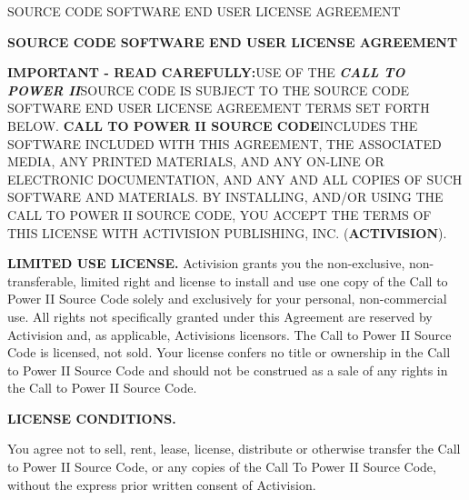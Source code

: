 \begin{section}{SOURCE CODE SOFTWARE END USER LICENSE AGREEMENT}

\begin{center}
\textbf{{\small SOURCE CODE SOFTWARE END USER LICENSE AGREEMENT}}
\end{center}

\begin{flushleft}
\textbf{{\footnotesize IMPORTANT - READ CAREFULLY:}}{\footnotesize  USE OF THE }\textbf{\textit{{\footnotesize CALL TO POWER II}}}{\footnotesize  SOURCE CODE IS SUBJECT TO THE SOURCE CODE SOFTWARE END USER LICENSE AGREEMENT TERMS SET FORTH BELOW. }\textbf{{\footnotesize CALL TO POWER II SOURCE CODE}}{\footnotesize  INCLUDES THE SOFTWARE INCLUDED WITH THIS AGREEMENT, THE ASSOCIATED MEDIA, ANY PRINTED MATERIALS, AND ANY ON-LINE OR ELECTRONIC DOCUMENTATION, AND ANY AND ALL COPIES OF SUCH SOFTWARE AND MATERIALS.  BY INSTALLING, AND/OR USING THE CALL TO POWER II SOURCE CODE, YOU ACCEPT THE TERMS OF THIS LICENSE WITH ACTIVISION PUBLISHING, INC. (}\textbf{{\footnotesize ACTIVISION}}{\footnotesize ). }
\end{flushleft}


\begin{flushleft}
\textbf{{\footnotesize LIMITED USE LICENSE.  }}{\footnotesize Activision grants you the non-exclusive, non-transferable, limited right and license to install and use one copy of the Call to Power II Source Code solely and exclusively for your personal, non-commercial use.  All rights not specifically granted under this Agreement are reserved by Activision and, as applicable, Activisions licensors.  The Call to Power II Source Code is licensed, not sold.  Your license confers no title or ownership in the Call to Power II Source Code and should not be construed as a sale of any rights in the Call to Power II Source Code.}
\end{flushleft}


\begin{flushleft}
\textbf{{\footnotesize LICENSE CONDITIONS.}}
\end{flushleft}


\begin{flushleft}
\textbf{{\footnotesize 	}}{\footnotesize You agree not to sell, rent, lease, license, distribute or otherwise transfer the Call to Power II Source Code, or any copies of the Call To Power II Source Code, without the express prior written consent of Activision.}
\end{flushleft}



\end{section}
